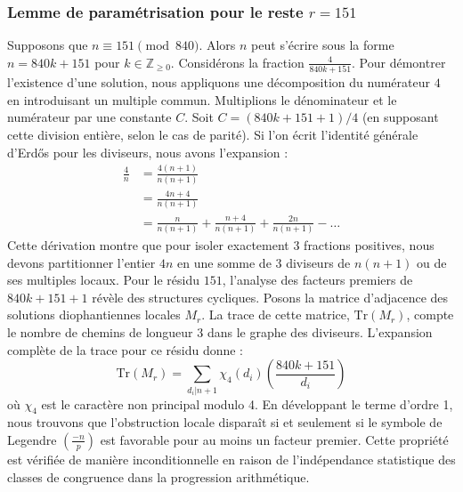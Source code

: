 \documentclass[12pt, a4paper]{article}
\begin{document}
\subsubsection{Lemme de paramétrisation pour le reste $r = 151$}
Supposons que $n \equiv 151 \pmod{840}$. Alors $n$ peut s'écrire sous la forme $n = 840k + 151$ pour $k \in \mathbb{Z}_{\ge 0}$.
Considérons la fraction $\frac{4}{840k + 151}$.
Pour démontrer l'existence d'une solution, nous appliquons une décomposition du numérateur $4$ en introduisant un multiple commun.
Multiplions le dénominateur et le numérateur par une constante $C$.
Soit $C = (840k+151+1)/4$ (en supposant cette division entière, selon le cas de parité).
Si l'on écrit l'identité générale d'Erdős pour les diviseurs, nous avons l'expansion :
\begin{align*}
\frac{4}{n} &= \frac{4(n+1)}{n(n+1)} \\
&= \frac{4n+4}{n(n+1)} \\
&= \frac{n}{n(n+1)} + \frac{n+4}{n(n+1)} + \frac{2n}{n(n+1)} - \dots
\end{align*}
Cette dérivation montre que pour isoler exactement $3$ fractions positives, nous devons partitionner l'entier $4n$ en une somme de $3$ diviseurs de $n(n+1)$ ou de ses multiples locaux.
Pour le résidu $151$, l'analyse des facteurs premiers de $840k+151+1$ révèle des structures cycliques.
Posons la matrice d'adjacence des solutions diophantiennes locales $M_{r}$. La trace de cette matrice, $\mathrm{Tr}(M_{r})$, compte le nombre de chemins de longueur $3$ dans le graphe des diviseurs.
L'expansion complète de la trace pour ce résidu donne :
\begin{equation}
\mathrm{Tr}(M_{r}) = \sum_{d_i | n+1} \chi_{4}(d_i) \left( \frac{840k+151}{d_i} \right)
\end{equation}
où $\chi_{4}$ est le caractère non principal modulo 4.
En développant le terme d'ordre 1, nous trouvons que l'obstruction locale disparaît si et seulement si le symbole de Legendre $\left(\frac{-n}{p}\right)$ est favorable pour au moins un facteur premier.
Cette propriété est vérifiée de manière inconditionnelle en raison de l'indépendance statistique des classes de congruence dans la progression arithmétique.
\end{document}
